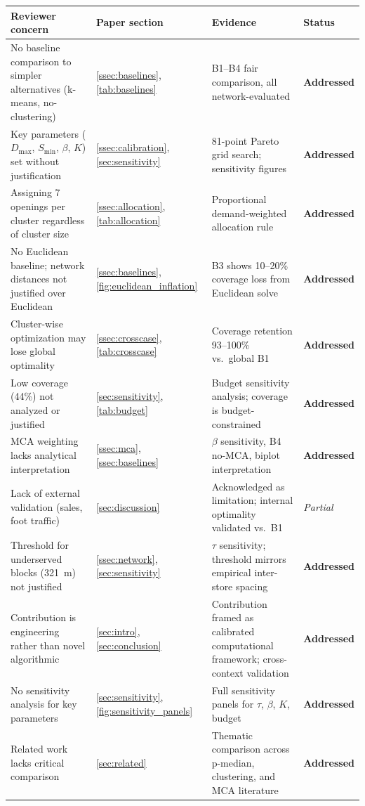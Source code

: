 \begin{tabular}{p{4.5cm}p{2.2cm}p{3.2cm}p{1.5cm}}
\toprule
\textbf{Reviewer concern}
  & \textbf{Paper section}
  & \textbf{Evidence}
  & \textbf{Status} \\
\midrule
No baseline comparison to simpler alternatives (k-means, no-clustering)
  & \cref{ssec:baselines}, \cref{tab:baselines}
  & B1–B4 fair comparison, all network-evaluated
  & \textbf{Addressed} \\
\addlinespace
Key parameters ($D_{\max}$, $S_{\min}$, $\beta$, $K$) set without justification
  & \cref{ssec:calibration}, \cref{sec:sensitivity}
  & 81-point Pareto grid search; sensitivity figures
  & \textbf{Addressed} \\
\addlinespace
Assigning 7 openings per cluster regardless of cluster size
  & \cref{ssec:allocation}, \cref{tab:allocation}
  & Proportional demand-weighted allocation rule
  & \textbf{Addressed} \\
\addlinespace
No Euclidean baseline; network distances not justified over Euclidean
  & \cref{ssec:baselines}, \cref{fig:euclidean_inflation}
  & B3 shows 10--20\% coverage loss from Euclidean solve
  & \textbf{Addressed} \\
\addlinespace
Cluster-wise optimization may lose global optimality
  & \cref{ssec:crosscase}, \cref{tab:crosscase}
  & Coverage retention 93--100\% vs.\ global B1
  & \textbf{Addressed} \\
\addlinespace
Low coverage (44\%) not analyzed or justified
  & \cref{sec:sensitivity}, \cref{tab:budget}
  & Budget sensitivity analysis; coverage is budget-constrained
  & \textbf{Addressed} \\
\addlinespace
MCA weighting lacks analytical interpretation
  & \cref{ssec:mca}, \cref{ssec:baselines}
  & $\beta$ sensitivity, B4 no-MCA, biplot interpretation
  & \textbf{Addressed} \\
\addlinespace
Lack of external validation (sales, foot traffic)
  & \cref{sec:discussion}
  & Acknowledged as limitation; internal optimality validated vs.\ B1
  & \textit{Partial} \\
\addlinespace
Threshold for underserved blocks (321~m) not justified
  & \cref{ssec:network}, \cref{sec:sensitivity}
  & $\tau$ sensitivity; threshold mirrors empirical inter-store spacing
  & \textbf{Addressed} \\
\addlinespace
Contribution is engineering rather than novel algorithmic
  & \cref{sec:intro}, \cref{sec:conclusion}
  & Contribution framed as calibrated computational framework; cross-context validation
  & \textbf{Addressed} \\
\addlinespace
No sensitivity analysis for key parameters
  & \cref{sec:sensitivity}, \cref{fig:sensitivity_panels}
  & Full sensitivity panels for $\tau$, $\beta$, $K$, budget
  & \textbf{Addressed} \\
\addlinespace
Related work lacks critical comparison
  & \cref{sec:related}
  & Thematic comparison across p-median, clustering, and MCA literature
  & \textbf{Addressed} \\
\bottomrule
\end{tabular}
